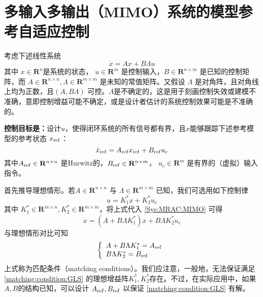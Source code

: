 \section{多输入多输出（MIMO）系统的模型参考自适应控制}\label{4Cref}
考虑下述线性系统
\begin{equation}
  \dot{x} = A  x + B \Lambda u\label{Sys:MRAC:MIMO}
\end{equation}
其中 $x \in \mathbf{R}^n$是系统的状态， $u \in \mathbf{R}^m$ 是控制输入，$B \in \mathbf{R}^{n \times m}$ 是已知的控制矩阵，而 $A \in \mathbf{R}^{n \times n}, \Lambda \in \mathbf{R}^{m \times m}$ 是未知的常值矩阵。又假设  $\Lambda$ 是对角阵，且对角线上均为正数，且$(A, B \Lambda)$ 可控。$\Lambda$是不确定的，这是用于刻画控制失效或建模不准确，意即控制增益可能不确定，或是设计者估计的系统控制效果可能是不准确的。

{\bf 控制目标是：}设计$u$，使得闭环系统的所有信号都有界，且$x$能够跟踪下述参考模型的参考状态 $x_{\operatorname{ref}}$：
 \begin{equation}
    \dot{x}_{\operatorname{ref}} =
    A_{\operatorname{ref}} x_{\operatorname{ref}} +
    B_{\operatorname{ref}} u_c\label{ideal_mimo}
  \end{equation}
其中$A_{\operatorname{ref}} \in \mathbf{R}^{n \times n}$ 是Hurwitz的，$B_{\operatorname{ref}} \in \mathbf{R}^{n \times m}$， $u_c \in \mathbf{R}^m$ 是有界的（虚拟）输入指令。

首先推导理想情形。若$A \in \mathbf{R}^{n \times n}$ 与 $\Lambda \in \mathbf{R}^{m\times m}$ 已知，我们可选用如下控制律
\[ u = K^{\ast}_1 x + K^{\ast}_2 u_c \]
其中 $K^{\ast}_1 \in \mathbf{R}^{m \times n}, K^{\ast}_2 \in \mathbf{R}^{m
\times m}$，将上式代入 \eqref{Sys:MRAC:MIMO} 可得
\[ \dot{x} = (A + B \Lambda K^{\ast}_1) x + B \Lambda K^{\ast}_2 u_c \]
与理想情形对比可知
\begin{equation}
  \left\{\begin{array}{l}
    A + B \Lambda K^{\ast}_1 = A_{\operatorname{ref}}\\
    B \Lambda K^{\ast}_2 = B_{\operatorname{ref}}
  \end{array}\right. \label{matching:condition:GLS}
\end{equation}
上式称为匹配条件（matching conditions）。我们应注意，一般地，无法保证满足 \eqref{matching:condition:GLS} 的理想增益阵$K^{\ast}_1, K^{\ast}_2$存在。不过，在实际应用中，如果$A, B$的结构已知，可以设计 $A_{\operatorname{ref}}, B_{\operatorname{ref}}$ 以保证 \eqref{matching:condition:GLS} 有解。

